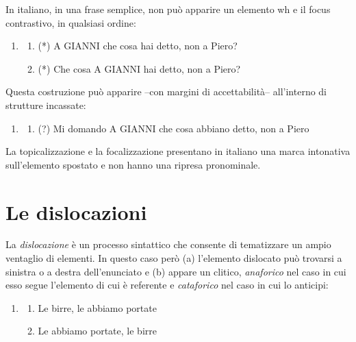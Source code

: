\documentclass[
  a4paper,
  twoside,
  11pt,
  chapterprefix=false,
  bibliography=totocnumbered,
  listof=flat]{scrbook}
\providecommand{\tightlist}{%
  \setlength{\itemsep}{0pt}\setlength{\parskip}{0pt}}
\begin{document}
In italiano, in una frase semplice, non può apparire un elemento wh e il focus contrastivo, in qualsiasi ordine:

\begin{enumerate}
\def\labelenumi{(\arabic{enumi})}
\setcounter{enumi}{167}
\item
  \begin{enumerate}
  \def\labelenumii{\alph{enumii}.}
  \tightlist
  \item
    (*) A GIANNI che cosa hai detto, non a Piero?
  \item
    (*) Che cosa A GIANNI hai detto, non a Piero?
  \end{enumerate}
\end{enumerate}

Questa costruzione può apparire --con margini di accettabilità-- all'interno di strutture incassate:

\begin{enumerate}
\def\labelenumi{(\arabic{enumi})}
\setcounter{enumi}{168}
\item
  \begin{enumerate}
  \def\labelenumii{\alph{enumii}.}
  \tightlist
  \item
    (?) Mi domando A GIANNI che cosa abbiano detto, non a Piero
  \end{enumerate}
\end{enumerate}

La topicalizzazione e la focalizzazione presentano in italiano una marca intonativa sull'elemento spostato e non hanno una ripresa pronominale.

\hypertarget{le-dislocazioni}{%
\section{Le dislocazioni}\label{le-dislocazioni}}

La \emph{dislocazione} è un processo sintattico che consente di tematizzare un ampio ventaglio di elementi. In questo caso però (a) l'elemento dislocato può trovarsi a sinistra o a destra dell'enunciato e (b) appare un clitico, \emph{anaforico} nel caso in cui esso segue l'elemento di cui è referente e \emph{cataforico} nel caso in cui lo anticipi:

\begin{enumerate}
\def\labelenumi{(\arabic{enumi})}
\setcounter{enumi}{169}
\item
  \begin{enumerate}
  \def\labelenumii{\alph{enumii}.}
  \tightlist
  \item
    Le birre, le abbiamo portate
  \item
    Le abbiamo portate, le birre
  \end{enumerate}
\end{enumerate}
\end{document}
